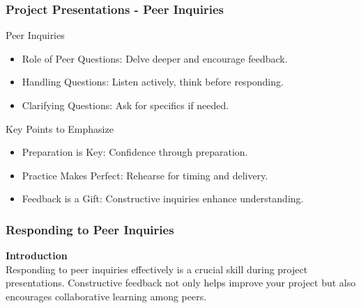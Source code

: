 \documentclass[aspectratio=169]{beamer}
\begin{document}
\begin{frame}[fragile]
    \frametitle{Project Presentations - Peer Inquiries}
    \begin{block}{Peer Inquiries}
        \begin{itemize}
            \item Role of Peer Questions: Delve deeper and encourage feedback.
            \item Handling Questions: Listen actively, think before responding.
            \item Clarifying Questions: Ask for specifics if needed.
        \end{itemize}
    \end{block}
    \begin{block}{Key Points to Emphasize}
        \begin{itemize}
            \item Preparation is Key: Confidence through preparation.
            \item Practice Makes Perfect: Rehearse for timing and delivery.
            \item Feedback is a Gift: Constructive inquiries enhance understanding.
        \end{itemize}
    \end{block}
\end{frame}

\begin{frame}[fragile]
    \frametitle{Responding to Peer Inquiries}
    \textbf{Introduction} \\
    Responding to peer inquiries effectively is a crucial skill during project presentations. Constructive feedback not only helps improve your project but also encourages collaborative learning among peers.
\end{frame}
\end{document}
